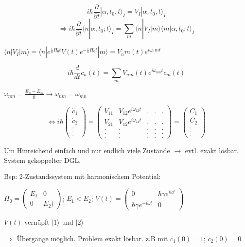 \[ i\hbar \frac{\partial}{\partial t}|\alpha,t_0,t\rangle_I = V_I|\alpha,t_0,t\rangle_I\]
\[\Rightarrow i\hbar\frac{\partial}{\partial t}\langle n|\alpha,t_0;t\rangle_I = \sum_m \langle n|V_I|m\rangle\langle m|\alpha,t_0;t\rangle_I\]

\(\langle n|V_I|m\rangle = \langle n | e^{\frac{i}{\hbar}H_0t}V(t)e^{-\frac{i}{\hbar}H_0t}|m\rangle = V_nm(t) e^{i\omega_nm t}\)

\[\boxed{i\hbar \frac{d}{dt}c_n(t) = \sum_m V_{nm}(t) e^{i\omega_{nm}t}c_m(t)}\]

\(\omega_{nm}=\frac{E_n-E_m}{\hbar}\rightarrow \omega_{nm}=\omega_{mn}\)

\[\Leftrightarrow i\hbar \begin{pmatrix}\dot c_1\\\dot c_2\\.\\.\\.\end{pmatrix} =\begin{pmatrix}V_{11}&V_{12}e^{i\omega_{12}t}&.&.&.\\
  V_{21}&V_{12}e^{i\omega_{21}t}&.&.&.\\
  .&.&.&.&.\\
  .&.&.&.&.\\
  .&.&.&.&.
\end{pmatrix}=\begin{pmatrix}C_1\\C_2\\.\\.\\.\end{pmatrix}\]

Um Hinreichend einfach und nur endlich viele Zustände \(\rightarrow\) evtl. exakt lösbar. System gekoppelter DGL.

Bsp: 2-Zustandssystem mit harmonischem Potential:

\(H_0 =\begin{pmatrix} E_1& 0\\0&E_2)\end{pmatrix}\); \(E_1<E_2\); \(V(t) =\begin{pmatrix}0&\hbar \gamma e^{i\omega t}\\\hbar \gamma e^{-i\omega t}&0 \end{pmatrix}\)

\(V(t)\) vernüpft \(|1\rangle\) und \(|2\rangle\)

\(\Rightarrow\) Übergänge möglich. Problem exakt lösbar. z.B mit \(c_1(0)=1\); \(c_2(0)=0\)

